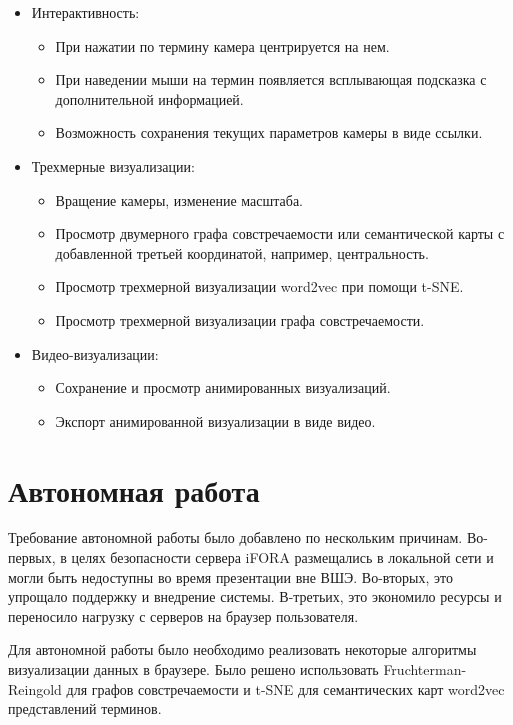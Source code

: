 \begin{itemize}
\item Интерактивность:
  \begin{itemize}
  \item При нажатии по термину камера центрируется на нем.
  \item При наведении мыши на термин появляется всплывающая подсказка с дополнительной информацией.
  \item Возможность сохранения текущих параметров камеры в виде ссылки.
  \end{itemize}

\item Трехмерные визуализации:
  \begin{itemize}
  \item Вращение камеры, изменение масштаба.
  \item Просмотр двумерного графа совстречаемости или семантической карты с добавленной третьей координатой, например, центральность.
  \item Просмотр трехмерной визуализации word2vec при помощи t-SNE.
  \item Просмотр трехмерной визуализации графа совстречаемости.
  \end{itemize}

\item Видео-визуализации:
  \begin{itemize}
  \item Сохранение и просмотр анимированных визуализаций.
  \item Экспорт анимированной визуализации в виде видео.
  \end{itemize}
\end{itemize}

\section{Автономная работа}

Требование автономной работы было добавлено по нескольким причинам. Во-первых, в целях безопасности сервера iFORA размещались в локальной сети и могли быть недоступны во время презентации вне ВШЭ. Во-вторых, это упрощало поддержку и внедрение системы. В-третьих, это экономило ресурсы и переносило нагрузку с серверов на браузер пользователя.

Для автономной работы было необходимо реализовать некоторые алгоритмы визуализации данных в браузере. Было решено использовать Fruchterman-Reingold для графов совстречаемости и t-SNE для семантических карт word2vec представлений терминов.

